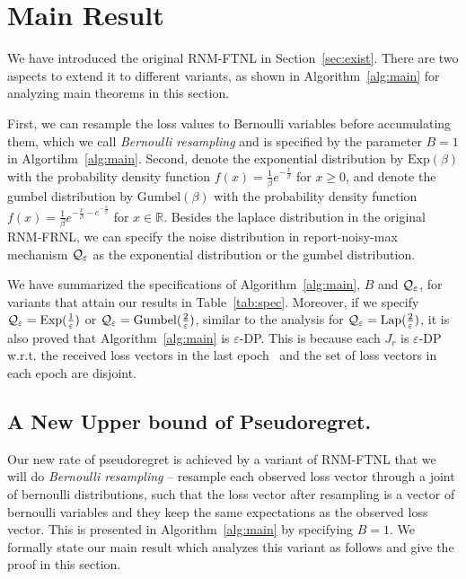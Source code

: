 \section{Main Result}
\label{sec:main}
%
We have introduced the original RNM-FTNL in Section~\ref{sec:exist}. There are two aspects to extend it to different variants, as shown in Algorithm~\ref{alg:main} for analyzing main theorems in this section.

First, we can resample the loss values to Bernoulli variables before accumulating them, which we call \textit{Bernoulli resampling} and is specified by the parameter $B=1$ in Algortihm~\ref{alg:main}. 
Second, denote the exponential distribution by $\mathrm{Exp}(\beta)$ with the probability density function $f(x)=\frac{1}{\beta} e^{-\frac{x}{\beta}}$ for $x\geq 0$, and denote the gumbel distribution by $\mathrm{Gumbel}(\beta)$ with the probability density function $f(x)=\frac{1}{\beta}e^{-\frac{x}{\beta} - e^{-\frac{x}{\beta}}}$ for $x\in \mathbb{R}$.
Besides the laplace distribution in the original RNM-FRNL, we can specify the noise distribution in report-noisy-max mechanism $\mathcal{Q}_{\varepsilon}$ as the exponential distribution or the gumbel distribution. 

We have summarized the specifications of Algorithm~\ref{alg:main}, $B$ and $\mathcal{Q}_{\varepsilon}$, for variants that attain our results in Table~\ref{tab:spec}.
Moreover, if we specify $\mathcal{Q}_{\varepsilon}=\mathrm{Exp}(\frac{1}{\varepsilon})$ or $\mathcal{Q}_{\varepsilon}=\mathrm{Gumbel}(\frac{2}{\varepsilon})$, similar to the analysis for $\mathcal{Q}_{\varepsilon}=\mathrm{Lap}(\frac{2}{\varepsilon})$, it is also proved that Algorithm~\ref{alg:main} is $\varepsilon$-DP. 
This is because each $J_r$ is $\varepsilon$-DP w.r.t. the received loss vectors in the last epoch~\citep{dwork2014algorithmic,qiao2021oneshot} and the set of loss vectors in each epoch are disjoint.


\subsection{A New Upper bound of Pseudoregret.}
\label{sec:result_original}
Our new rate of pseudoregret is achieved by a variant of RNM-FTNL that we will do \textit{Bernoulli resampling} -- resample each observed loss vector through a joint of bernoulli distributions, such that the loss vector after resampling is a vector of bernoulli variables and they keep the same expectations as the observed loss vector.
This is presented in Algorithm~\ref{alg:main} by specifying $B=1$.
We formally state our main result which analyzes this variant as follows and give the proof in this section.

